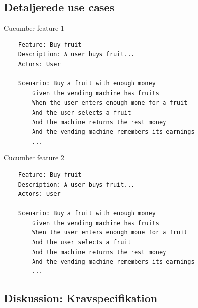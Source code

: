 \subsection{Detaljerede use cases}
\begin{listing}[H]
    \centering
    \caption{Cucumber feature 1}\label{lst:feature1}
    \begin{verbatim}
    Feature: Buy fruit
    Description: A user buys fruit...
    Actors: User
        
    Scenario: Buy a fruit with enough money
        Given the vending machine has fruits
        When the user enters enough mone for a fruit
        And the user selects a fruit
        And the machine returns the rest money
        And the vending machine remembers its earnings
        ...
    \end{verbatim}
\end{listing}

\begin{listing}[H]
    \centering
    \caption{Cucumber feature 2}\label{lst:feature2}
    \begin{verbatim}
    Feature: Buy fruit
    Description: A user buys fruit...
    Actors: User
    
    Scenario: Buy a fruit with enough money
        Given the vending machine has fruits
        When the user enters enough mone for a fruit
        And the user selects a fruit
        And the machine returns the rest money
        And the vending machine remembers its earnings
        ...
    \end{verbatim}
\end{listing}

\subsection{Diskussion: Kravspecifikation}